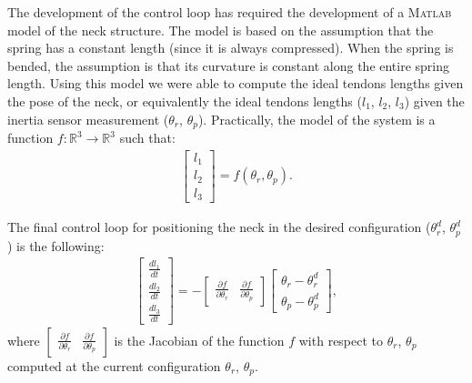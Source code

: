 The development of the control loop has required the development of a \textsc{Matlab} model of the neck structure. The model is based on the assumption that the spring has a constant length (since it is always compressed). When the spring is bended, the assumption is that its curvature is constant along the entire spring length. Using this model we were able to compute the ideal tendons lengths given the pose of the neck, or equivalently the ideal tendons lengths ($l_1$, $l_2$, $l_3$) given the inertia sensor measurement ($\theta_r$, $\theta_p$). Practically, the model of the system is a function $f: \mathbb R^3 \longrightarrow \mathbb R^3$ such that:
\begin{eqnarray} \label{Eq:Model}
\begin{bmatrix}
l_1\\
l_2\\
l_3
\end{bmatrix} = f (\theta_r, \theta_p).
\end{eqnarray}

The final control loop for positioning the neck in the desired configuration ($\theta_r^d$, $\theta_p^d$) is the following:
\begin{eqnarray} \label{Eq:Control_V1}
\begin{bmatrix}
\frac{d l_1}{dt}\\
\frac{d l_2}{dt}\\
\frac{d l_3}{dt}
\end{bmatrix} = -\begin{bmatrix} \frac{\partial f} {\partial \theta_r} &  \frac{\partial f} {\partial \theta_p} \end{bmatrix}
 \begin{bmatrix}
\theta_r - \theta_r^d\\
\theta_p - \theta_p^d
\end{bmatrix},
\end{eqnarray}
where $\begin{bmatrix} \frac{\partial f} {\partial \theta_r} &  \frac{\partial f} {\partial \theta_p} \end{bmatrix}$ is the Jacobian of the function $f$ with respect to $\theta_r$, $\theta_p$ computed at the current configuration $\theta_r$, $\theta_p$. 

